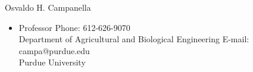 \documentclass[10pt]{article}
\renewcommand{\section}[1]{\pagebreak[3]%
    \hyphenpenalty=10000%
    \vspace{1.3\baselineskip}%
    \phantomsection\addcontentsline{toc}{section}{#1}%
    \noindent\llap{\scshape\smash{\parbox[t]{\marginparwidth}{\raggedright #1}}}%
    \vspace{-\baselineskip}\par}
\newenvironment{innerlist}[1][\enskip\textbullet]%
        {\begin{itemize}[#1,leftmargin=*,parsep=0pt,itemsep=0pt,topsep=0pt,partopsep=0pt]}
        {\end{itemize}}
\newcommand{\halfblankline}{\quad\vspace{-0.5\baselineskip}\pagebreak[3]}
\providecommand\Matlab{\textsc{Matlab}}
\begin{document}
\halfblankline

Osvaldo H. Campanella 
\begin{innerlist}
\item[] Professor \hfill {Phone: 612-626-9070}\\
Department of Agricultural and Biological Engineering \hfill{E-mail: campa@purdue.edu}\\
Purdue University
\end{innerlist}

\begin{comment}
Computer Programming:
%
\begin{innerlist}
    \item C, C$+$$+$, Java, JavaScript, NetLogo, Pascal, Perl, PHP,
        Lisp, UNIX shell scripting (including POSIX.2), GNU make,
        AppleScript, SQL, MySQL, \Matlab, Maple, Mathematica, and others
\end{innerlist}

\halfblankline
\end{comment}
\end{document}
